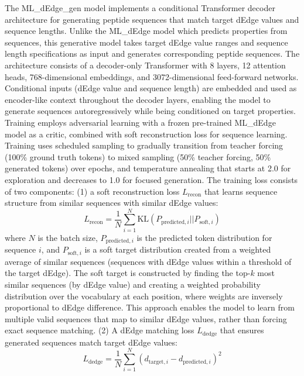 The ML\_dEdge\_gen model implements a conditional Transformer decoder architecture for generating peptide sequences that match target dEdge values and sequence lengths.
Unlike the ML\_dEdge model which predicts properties from sequences, this generative model takes target dEdge value ranges and sequence length specifications as input and generates corresponding peptide sequences.
The architecture consists of a decoder-only Transformer with 8 layers, 12 attention heads, 768-dimensional embeddings, and 3072-dimensional feed-forward networks.
Conditional inputs (dEdge value and sequence length) are embedded and used as encoder-like context throughout the decoder layers, enabling the model to generate sequences autoregressively while being conditioned on target properties.
Training employs adversarial learning with a frozen pre-trained ML\_dEdge model as a critic, combined with soft reconstruction loss for sequence learning.
Training uses scheduled sampling to gradually transition from teacher forcing (100\% ground truth tokens) to mixed sampling (50\% teacher forcing, 50\% generated tokens) over epochs, and temperature annealing that starts at 2.0 for exploration and decreases to 1.0 for focused generation.
The training loss consists of two components: (1) a soft reconstruction loss $L_{\text{recon}}$ that learns sequence structure from similar sequences with similar dEdge values:
\begin{equation}
L_{\text{recon}} = \frac{1}{N} \sum_{i=1}^{N} \text{KL}(P_{\text{predicted},i} || P_{\text{soft},i})
\end{equation}
where $N$ is the batch size, $P_{\text{predicted},i}$ is the predicted token distribution for sequence $i$, and $P_{\text{soft},i}$ is a soft target distribution created from a weighted average of similar sequences (sequences with dEdge values within a threshold of the target dEdge).
The soft target is constructed by finding the top-$k$ most similar sequences (by dEdge value) and creating a weighted probability distribution over the vocabulary at each position, where weights are inversely proportional to dEdge difference.
This approach enables the model to learn from multiple valid sequences that map to similar dEdge values, rather than forcing exact sequence matching.
(2) A dEdge matching loss $L_{\text{dedge}}$ that ensures generated sequences match target dEdge values:
\begin{equation}
L_{\text{dedge}} = \frac{1}{N} \sum_{i=1}^{N} (d_{\text{target},i} - d_{\text{predicted},i})^2
\end{equation}
